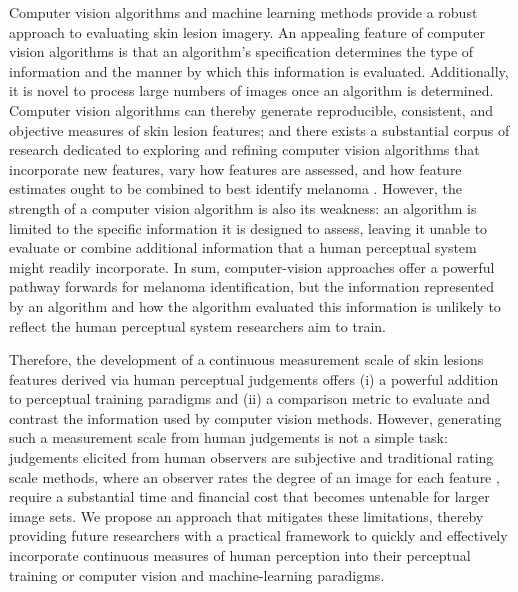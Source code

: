 \documentclass[
    man, 12pt, a4paper,
    donotrepeattitle, floatsintext, draftfirst
]{apa7}
\begin{document}
{\color{red}
    Computer vision algorithms and machine learning methods provide a robust approach to evaluating skin lesion imagery.
    An appealing feature of computer vision algorithms is that an algorithm's specification determines the type of information and the manner by which this information is evaluated.
    Additionally, it is novel to process large numbers of images once an algorithm is determined.
    Computer vision algorithms can thereby generate reproducible, consistent, and objective measures of skin lesion features; and there exists a substantial corpus of research dedicated to exploring and refining computer vision algorithms that incorporate new features, vary how features are assessed, and how feature estimates ought to be combined to best identify melanoma \parencite{maglogiannis2009overview, majumder2019feature, saba2021computer,wu2022skin}.
    However, the strength of a computer vision algorithm is also its weakness: an algorithm is limited to the specific information it is designed to assess, leaving it unable to evaluate or combine additional information that a human perceptual system might readily incorporate.
    In sum, computer-vision approaches offer a powerful pathway forwards for melanoma identification, but the information represented by an algorithm and how the algorithm evaluated this information is unlikely to reflect the human perceptual system researchers aim to train.

    Therefore, the development of a continuous measurement scale of skin lesions features derived via human perceptual judgements offers (i) a powerful addition to perceptual training paradigms and (ii) a comparison metric to evaluate and contrast the information used by computer vision methods.
    However, generating such a measurement scale from human judgements is not a simple task: judgements elicited from human observers are subjective and traditional rating scale methods, where an observer rates the degree of an image for each feature \parencite[e.g., ][]{meyer1996interobserver, gunasti2008interrater, aldridge2011novice, zanotto2011visual}, require a substantial time and financial cost that becomes untenable for larger image sets.
    We propose an approach that mitigates these limitations, thereby providing future researchers with a practical framework to quickly and effectively incorporate continuous measures of human perception into their perceptual training or computer vision and machine-learning paradigms.
}
\end{document}
